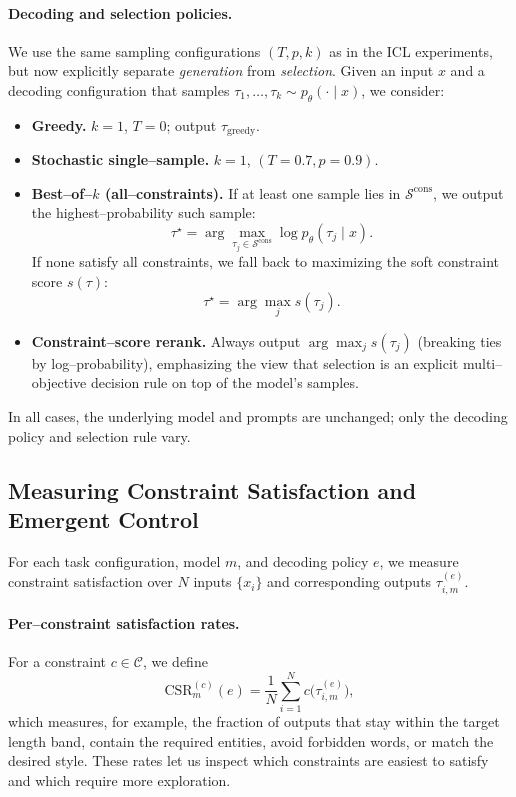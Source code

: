 \paragraph{Decoding and selection policies.}
We use the same sampling configurations $(T,p,k)$ as in the ICL experiments,
but now explicitly separate \emph{generation} from \emph{selection}. Given
an input $x$ and a decoding configuration that samples
$\tau_1,\dots,\tau_k \sim p_\theta(\cdot \mid x)$, we consider:
\begin{itemize}
  \item \textbf{Greedy.} $k{=}1$, $T{=}0$; output $\tau_{\text{greedy}}$.
  \item \textbf{Stochastic single--sample.} $k{=}1$, $(T{=}0.7, p{=}0.9)$.
  \item \textbf{Best--of--$k$ (all--constraints).}
        If at least one sample lies in $\mathcal{S}^{\text{cons}}$, we output
        the highest--probability such sample:
        \[
        \tau^{\star} = \arg\max_{\tau_j\in\mathcal{S}^{\text{cons}}}
        \log p_\theta(\tau_j\mid x).
        \]
        If none satisfy all constraints, we fall back to maximizing the soft
        constraint score $s(\tau)$:
        \[
        \tau^{\star} = \arg\max_{j} s(\tau_j).
        \]
  \item \textbf{Constraint--score rerank.}
        Always output $\arg\max_j s(\tau_j)$ (breaking ties by log--probability),
        emphasizing the view that selection is an explicit multi--objective
        decision rule on top of the model's samples.
\end{itemize}
In all cases, the underlying model and prompts are unchanged; only the decoding
policy and selection rule vary.


\subsection{Measuring Constraint Satisfaction and Emergent Control}
\label{subsec:style-metrics}

For each task configuration, model $m$, and decoding policy $e$, we measure
constraint satisfaction over $N$ inputs $\{x_i\}$ and corresponding outputs
$\tau^{(e)}_{i,m}$.

\paragraph{Per--constraint satisfaction rates.}
For a constraint $c\in\mathcal{C}$, we define
\[
\mathrm{CSR}^{(c)}_{m}(e)
= \frac{1}{N} \sum_{i=1}^{N} c\big(\tau^{(e)}_{i,m}\big),
\]
which measures, for example, the fraction of outputs that stay within the
target length band, contain the required entities, avoid forbidden words, or
match the desired style. These rates let us inspect which constraints are
easiest to satisfy and which require more exploration.

